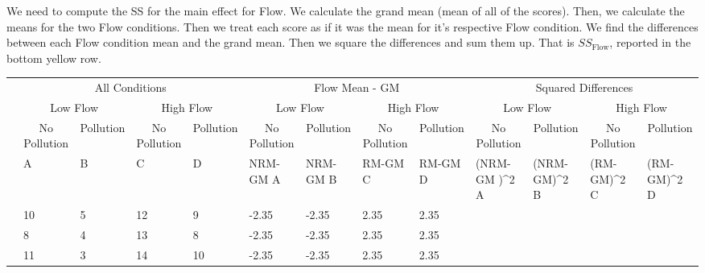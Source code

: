 \documentclass[
  letterpaper,
  DIV=11,
  numbers=noendperiod]{scrreprt}
\begin{document}
We need to compute the SS for the main effect for Flow. We calculate the
grand mean (mean of all of the scores). Then, we calculate the means for
the two Flow conditions. Then we treat each score as if it was the mean
for it's respective Flow condition. We find the differences between each
Flow condition mean and the grand mean. Then we square the differences
and sum them up. That is \(SS_\text{Flow}\), reported in the bottom
yellow row.

\begin{table}
\centering
\begin{tabular}{l|l|l|l|l|l|l|l|l|>{}l|>{}l|>{}l|>{}l}
\hline
\multicolumn{1}{c|}{ } & \multicolumn{4}{c|}{All Conditions} & \multicolumn{4}{c|}{Flow Mean - GM} & \multicolumn{4}{c}{Squared Differences} \\
\cline{2-5} \cline{6-9} \cline{10-13}
\multicolumn{1}{c|}{ } & \multicolumn{2}{c|}{Low Flow} & \multicolumn{2}{c|}{High Flow} & \multicolumn{2}{c|}{Low Flow} & \multicolumn{2}{c|}{High Flow} & \multicolumn{2}{c|}{Low Flow} & \multicolumn{2}{c}{High Flow} \\
\cline{2-3} \cline{4-5} \cline{6-7} \cline{8-9} \cline{10-11} \cline{12-13}
\multicolumn{1}{c|}{ } & \multicolumn{1}{c|}{No Pollution} & \multicolumn{1}{c|}{Pollution} & \multicolumn{1}{c|}{No Pollution} & \multicolumn{1}{c|}{Pollution} & \multicolumn{1}{c|}{No Pollution} & \multicolumn{1}{c|}{Pollution} & \multicolumn{1}{c|}{No Pollution} & \multicolumn{1}{c|}{Pollution} & \multicolumn{1}{c|}{No Pollution} & \multicolumn{1}{c|}{Pollution} & \multicolumn{1}{c|}{No Pollution} & \multicolumn{1}{c}{Pollution} \\
\cline{2-2} \cline{3-3} \cline{4-4} \cline{5-5} \cline{6-6} \cline{7-7} \cline{8-8} \cline{9-9} \cline{10-10} \cline{11-11} \cline{12-12} \cline{13-13}
  & A & B & C & D & NRM-GM A & NRM-GM B & RM-GM C & RM-GM D & (NRM-GM )\textasciicircum{}2 A & (NRM-GM)\textasciicircum{}2 B & (RM-GM)\textasciicircum{}2 C & (RM-GM)\textasciicircum{}2 D\\
\hline
 & 10 & 5 & 12 & 9 & -2.35 & -2.35 & 2.35 & 2.35 & \cellcolor{yellow}{5.5225} & \cellcolor{yellow}{5.5225} & \cellcolor{yellow}{5.5225} & \cellcolor{yellow}{5.5225}\\
\hline
 & 8 & 4 & 13 & 8 & -2.35 & -2.35 & 2.35 & 2.35 & \cellcolor{yellow}{5.5225} & \cellcolor{yellow}{5.5225} & \cellcolor{yellow}{5.5225} & \cellcolor{yellow}{5.5225}\\
\hline
 & 11 & 3 & 14 & 10 & -2.35 & -2.35 & 2.35 & 2.35 & \cellcolor{yellow}{5.5225} & \cellcolor{yellow}{5.5225} & \cellcolor{yellow}{5.5225} & \cellcolor{yellow}{5.5225}\\

\end{tabular}
\end{table}
\end{document}
